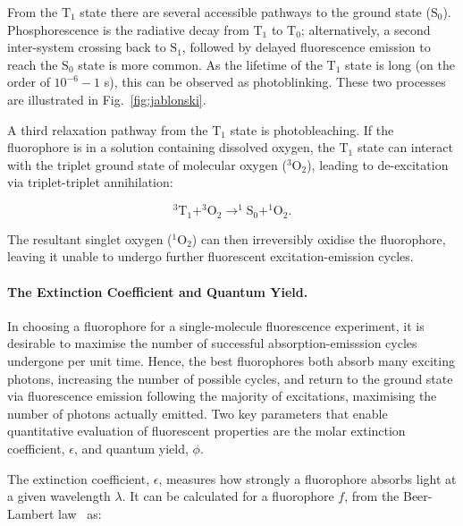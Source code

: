 From the $\text{T}_1$ state there are several accessible pathways to the ground state ($\text{S}_0$). Phosphorescence is the radiative decay from $\text{T}_1$ to $\text{T}_0$; alternatively, a second inter-system crossing back to $\text{S}_1$, followed by delayed fluorescence emission to reach the $\text{S}_0$ state is more common. As the lifetime of the $\text{T}_1$ state is long (on the order of $10^{-6} - 1$ s), this can be observed as photoblinking. These two processes are illustrated in Fig.~\ref{fig:jablonski}.  

A third relaxation pathway from the $\text{T}_1$ state is photobleaching. If the fluorophore is in a solution containing dissolved oxygen, the $\text{T}_1$ state can interact with the triplet ground state of molecular oxygen ($^3\text{O}_2$), leading to de-excitation via triplet-triplet annihilation:

\begin{equation}
^3\text{T}_1 + ^3\text{O}_2 \longrightarrow ^1\text{S}_0 + ^1\text{O}_2.
\label{eq:blinking1}
\end{equation} 

The resultant singlet oxygen ($^1\text{O}_2$) can then irreversibly oxidise the fluorophore, leaving it unable to undergo further fluorescent excitation-emission cycles.   


\paragraph{The Extinction Coefficient and Quantum Yield.}
\label{par:qy}
In choosing a fluorophore for a single-molecule fluorescence experiment, it is desirable to maximise the number of successful absorption-emisssion cycles undergone per unit time. Hence, the best fluorophores both absorb many exciting photons, increasing the number of possible cycles, and return to the ground state via fluorescence emission following the majority of excitations, maximising the number of photons actually emitted. Two key parameters that enable quantitative evaluation of fluorescent properties are the molar extinction coefficient, $\epsilon$, and quantum yield, $\phi$. 

The extinction coefficient, $\epsilon$, measures how strongly a fluorophore absorbs light at a given wavelength $\lambda$. It can be calculated for a fluorophore $f$, from the Beer-Lambert law~\cite{goldbook2006} as:


